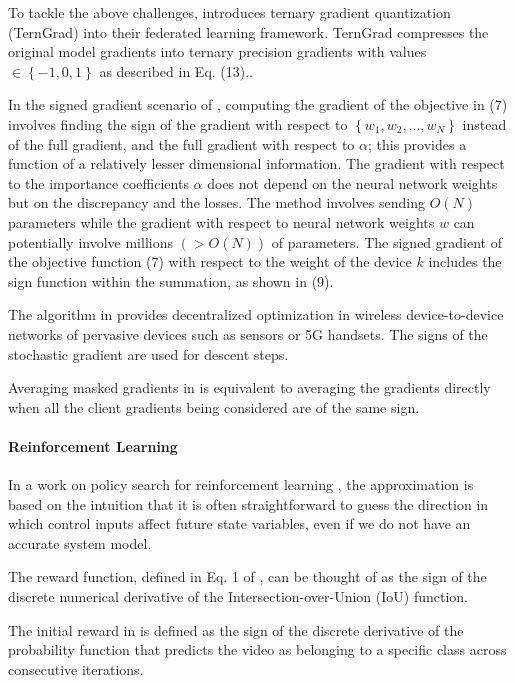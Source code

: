 \documentclass[11pt]{book}
\begin{document}
To tackle the above challenges, \cite{zhu2021distributed} introduces
ternary gradient quantization (TernGrad) into their federated learning
framework. TernGrad compresses the original model gradients into ternary
precision gradients with values $\in\left\{ -1,0,1\right\} $ as described
in Eq. (13)..

In the signed gradient scenario of \cite{mahara2021multi}, computing
the gradient of the objective in (7) involves finding the sign of
the gradient with respect to $\left\{ w_{1},w_{2},\ldots,w_{N}\right\} $
instead of the full gradient, and the full gradient with respect to
$\alpha$; this provides a function of a relatively lesser dimensional
information. The gradient with respect to the importance coefficients
$\alpha$ does not depend on the neural network weights but on the
discrepancy and the losses. The method involves sending $O\left(N\right)$
parameters while the gradient with respect to neural network weights
$w$ can potentially involve millions $\left(>O\left(N\right)\right)$
of parameters. The signed gradient of the objective function (7) with
respect to the weight of the device $k$ includes the sign function
within the summation, as shown in (9).

The algorithm in \cite{phuong2021decentralized} provides decentralized
optimization in wireless device-to-device networks of pervasive devices
such as sensors or 5G handsets. The signs of the stochastic gradient
are used for descent steps.

Averaging masked gradients in \cite{tenison2021gradient} is equivalent
to averaging the gradients directly when all the client gradients
being considered are of the same sign.

\paragraph{Reinforcement Learning}

In a work on policy search for reinforcement learning \cite{kolter2009policy}, the approximation is based on the intuition
that it is often straightforward to guess the direction in which control
inputs affect future state variables, even if we do not have an accurate
system model.

The reward function, defined in Eq. 1 of \cite{kong2017collaborative},
can be thought of as the sign of the discrete numerical derivative
of the Intersection-over-Union (IoU) function.

The initial reward in \cite{tang2018deep} is defined as the sign
of the discrete derivative of the probability function that predicts
the video as belonging to a specific class across consecutive iterations.
\end{document}
